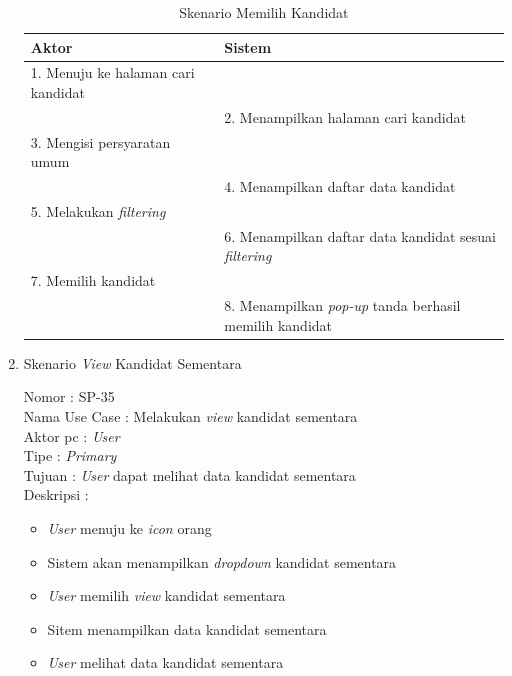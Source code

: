 \begin{enumerate}
\begin{itemize}
\end{itemize}

\begin{table}
	\caption{Skenario Memilih Kandidat}
	\centering
	\begin{tabular}{ | l | p{67.5mm}|}
		\hline 
		\textbf{Aktor} & \textbf{Sistem} \\
		\hline
		
		1.	Menuju ke halaman cari kandidat &  \\
		
		\hline
		
		&  2.	Menampilkan halaman cari kandidat \\
		
		\hline
		
		3. Mengisi persyaratan umum & \\
		
		\hline
		
		& 4. Menampilkan daftar data kandidat \\
		\hline
		
		5. Melakukan \textit{filtering} & \\
		\hline
		
		& 6. Menampilkan daftar data kandidat sesuai \textit{filtering} \\
		\hline
		
		
		7. Memilih kandidat & \\
		\hline
		
		&8. Menampilkan \textit{pop-up} tanda berhasil memilih kandidat \\
		\hline
		
	\end{tabular}
\end{table}

\item Skenario \textit{View} Kandidat Sementara

Nomor \kern 3.6pc : SP-35 \\
Nama Use Case : Melakukan \textit{view} kandidat sementara \\
Aktor  pc : \textit{User} \\
Tipe \kern 4.6pc : \textit{Primary} \\
Tujuan \kern 3.6pc : \textit{User} dapat melihat data kandidat sementara \\
Deskripsi \kern 2.5pc : 

\begin{itemize}
	\item \textit{User} menuju ke \textit{icon} orang
	\item Sistem akan menampilkan \textit{dropdown} kandidat sementara
	\item \textit{User} memilih \textit{view} kandidat sementara
	\item Sitem menampilkan data kandidat sementara
	\item \textit{User} melihat data kandidat sementara


\end{itemize}
\end{enumerate}
